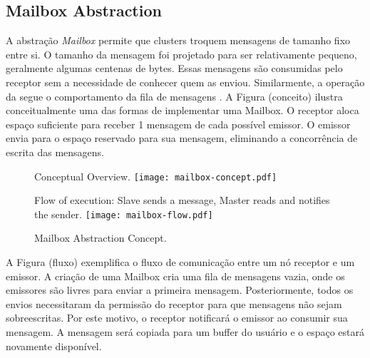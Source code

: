 		\subsection{Mailbox Abstraction}
		\label{sec.mailbox-abs}



			A abstração \textit{Mailbox} permite que clusters troquem mensagens
			de tamanho fixo entre si.
			O tamanho da mensagem foi projetado para ser relativamente pequeno,
			geralmente algumas centenas de bytes.
			Essas mensagens são consumidas pelo receptor sem a necessidade de conhecer quem as enviou.
			Similarmente, a operação da \mailbox segue o comportamento da fila de mensagens \posix.
			A Figura (conceito) ilustra conceitualmente uma das formas de implementar uma Mailbox.
			O receptor aloca espaço suficiente para receber 1 mensagem de cada possível emissor.
			O emissor envia para o espaço reservado para sua mensagem, eliminando a concorrência de escrita das mensagens.

			\begin{figure}[!tb]
				\centering%
				\caption{Mailbox Abstraction Concept.}%
				\label{fig:mailbox}%

					{Conceptual Overview.}%
					{\texttt{[image: mailbox-concept.pdf]}}%

				\hfill

					{Flow of execution: Slave sends a message, Master reads and notifies the sender.}%
					{\texttt{[image: mailbox-flow.pdf]}}%

			\end{figure}

			A Figura (fluxo) exemplifica o fluxo de comunicação entre um nó receptor e um emissor.
			A criação de uma Mailbox cria uma fila de mensagens vazia, onde os emissores são livres para enviar a primeira mensagem.
			Posteriormente, todos os envios necessitaram da permissão do receptor para que mensagens não sejam sobreescritas.
			Por este motivo, o receptor notificará o emissor ao consumir sua mensagem.
			A mensagem será copiada para um buffer do usuário e o espaço estará novamente disponível.

